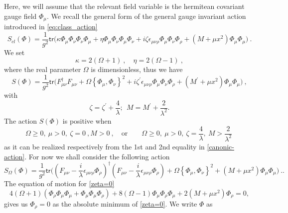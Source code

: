 \documentclass[11pt]{book}
\newcommand{\tr}{\mathsf{tr}}
\theoremstyle{break}
\begin{document}
Here, we will assume that the relevant field variable is the hermitean covariant gauge field $\Phi_\mu$. We recall the general form of the general gauge invariant action introduced in \eqref{eq:class_action}
%
\begin{equation}
S_{cl}(\Phi) = \frac{1}{g^2} \tr\bigg( \kappa \Phi_\mu \Phi_\nu \Phi_\nu \Phi_\mu + \eta \Phi_\mu \Phi_\nu \Phi_\mu \Phi_\nu + i \zeta \epsilon_{\mu\nu\rho} \Phi_\mu \Phi_\nu \Phi_\rho + (M+\mu x^2) \Phi_\mu \Phi_\mu \bigg) \ . 
\label{class_action_acov}
\end{equation}
%
We set 
%
\begin{equation}
\kappa= 2(\Omega+1) \ , \quad \eta= 2(\Omega-1) \ , \label{redef-param}
\end{equation}
%
where the real parameter $\Omega$ is dimensionless, thus we have
%
\begin{equation}
S(\Phi) = \frac{1}{g^2} \tr\bigg(F^\dag_{\mu\nu}F_{\mu\nu} + \Omega\left\{\Phi_\mu,\Phi_\nu\right\}^2 + i \zeta^\prime\epsilon_{\mu\nu\rho} \Phi_\mu \Phi_\nu \Phi_\rho + \left(M^\prime+\mu x^2\right) \Phi_\mu \Phi_\mu \bigg) \ , 
\label{canonic-action}
\end{equation}
%
with
%
\begin{equation}
\zeta = \zeta^\prime+\frac{4}{\lambda};\ \ M=M^\prime+\frac{2}{\lambda^2}. \label{new-param}
\end{equation}
%
The action $S(\Phi)$ is positive when 
%
\begin{equation}
\Omega\ge0,\ \mu>0,\ \zeta=0 \ ,  M>0 \ , \quad \mbox{or} \qquad 
\Omega\ge0,\ \mu>0,\ \zeta=\frac{4}{\lambda},\ M>\frac{2}{\lambda^2} \ 
\end{equation}
%
as it can be realized respectively from the 1st and 2nd equality in \eqref{canonic-action}. For now we shall consider the following action
%
\begin{equation}
S_\Omega(\Phi) = \frac{1}{g^2} \tr\bigg((F_{\mu\nu} - \frac{i}{\lambda} \epsilon_{\mu\nu\rho} \Phi_\rho)^\dag (F_{\mu\nu} - \frac{i}{\lambda} \epsilon_{\mu\nu\rho} \Phi_\rho) + \Omega\left\{\Phi_\mu,\Phi_\nu\right\}^2 + (M+\mu x^2) \Phi_\mu \Phi_\mu \bigg) \ . \label{zeta=0}.
\end{equation}
%
The equation of motion for \eqref{zeta=0} 
%
\begin{equation}
4(\Omega+1)(\Phi_\rho\Phi_\mu\Phi_\mu+\Phi_\mu\Phi_\mu\Phi_\rho)+8(\Omega-1)\Phi_\mu\Phi_\rho\Phi_\mu+2(M+\mu x^2) \Phi_\rho = 0\label{eqn-motion},
\end{equation}
%
gives us $\Phi_\rho=0$ as the absolute minimum of \eqref{zeta=0}. We write $\Phi$ as
\end{document}
